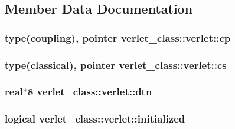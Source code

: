 \subsection{Member Data Documentation}
\hypertarget{structverlet__class_1_1verlet_a0537521e0e2f9c0cbdafc13f3099213c}{
\subsubsection[{cp}]{\setlength{\rightskip}{0pt plus 5cm}type(coupling), pointer verlet\+\_\+class\+::verlet\+::cp\hspace{0.3cm}{\ttfamily [private]}}}\label{structverlet__class_1_1verlet_a0537521e0e2f9c0cbdafc13f3099213c}
\hypertarget{structverlet__class_1_1verlet_a0f97f83e8828f3cdcf4c10c87aa75ff2}{
\subsubsection[{cs}]{\setlength{\rightskip}{0pt plus 5cm}type(classical), pointer verlet\+\_\+class\+::verlet\+::cs\hspace{0.3cm}{\ttfamily [private]}}}\label{structverlet__class_1_1verlet_a0f97f83e8828f3cdcf4c10c87aa75ff2}
\hypertarget{structverlet__class_1_1verlet_aef82a1c053fd56adcd35093e4165f00b}{
\subsubsection[{dtn}]{\setlength{\rightskip}{0pt plus 5cm}real$\ast$8 verlet\+\_\+class\+::verlet\+::dtn\hspace{0.3cm}{\ttfamily [private]}}}\label{structverlet__class_1_1verlet_aef82a1c053fd56adcd35093e4165f00b}
\hypertarget{structverlet__class_1_1verlet_aa839aa53f8a8d077a9e4b99937e00607}{
\subsubsection[{initialized}]{\setlength{\rightskip}{0pt plus 5cm}logical verlet\+\_\+class\+::verlet\+::initialized\hspace{0.3cm}{\ttfamily [private]}}}\label{structverlet__class_1_1verlet_aa839aa53f8a8d077a9e4b99937e00607}

